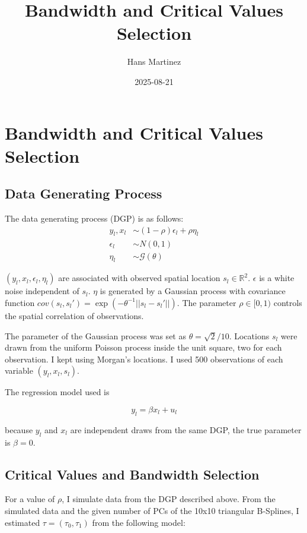 \documentclass[
]{article}
\title{Bandwidth and Critical Values Selection}
\author{Hans Martinez}
\date{2025-08-21}
\begin{document}
\maketitle

\section{Bandwidth and Critical Values
Selection}\label{bandwidth-and-critical-values-selection}

\subsection{Data Generating Process}\label{data-generating-process}

The data generating process (DGP) is as follows: \[
\begin{aligned}
    y_l, x_l &\sim (1-\rho)\epsilon_l +\rho \eta_l \\
    \epsilon_l &\sim N(0,1) \\
    \eta_l &\sim \mathcal{G}(\theta)
\end{aligned}
\]

\((y_l,x_l,\epsilon_l,\eta_l)\) are associated with observed spatial
location \(s_l \in \mathbb{R}^2\). \(\epsilon\) is a white noise
independent of \(s_l\). \(\eta\) is generated by a Gaussian process with
covariance function
\(cov(s_l,s_{l}')=\exp(-\theta^{-1}||s_l-s_{l}'||)\). The parameter
\(\rho\in[0,1)\) controls the spatial correlation of observations.

The parameter of the Gaussian process was set as \(\theta=\sqrt{2}/10\).
Locations \(s_l\) were drawn from the uniform Poisson process inside the
unit square, two for each observation. I kept using Morgan's locations.
I used 500 observations of each variable \((y_l,x_l,s_l)\).

The regression model used is

\[
    y_l=\beta x_l + u_l 
\]

because \(y_l\) and \(x_l\) are independent draws from the same DGP, the
true parameter is \(\beta=0\).

\subsection{Critical Values and Bandwidth
Selection}\label{critical-values-and-bandwidth-selection}

For a value of \(\rho\), I simulate data from the DGP described above.
From the simulated data and the given number of PCs of the 10x10
triangular B-Splines, I estimated \(\tau = (\tau_0, \tau_1)\) from the
following model:
\end{document}
